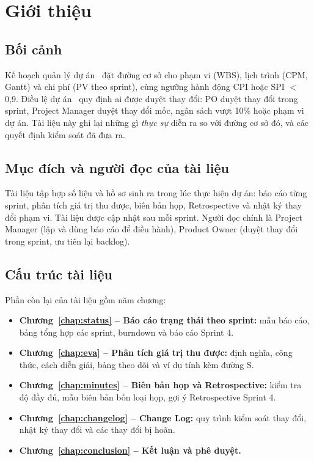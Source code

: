 \documentclass[12pt,a4paper]{report}
\begin{document}
\cleardoublepage{}
{}
\listoffigures

\cleardoublepage{}
{}
\listoftables

\chapter{Giới thiệu}
\label{chap:intro}

\section{Bối cảnh}

Kế hoạch quản lý dự án~\cite{pmp} đặt đường cơ sở cho phạm vi (WBS), lịch trình (CPM, Gantt) và chi phí (PV theo
sprint), cùng ngưỡng hành động CPI hoặc SPI $<$ 0,9. Điều lệ dự án~\cite{pid} quy định ai được duyệt thay đổi: PO
duyệt thay đổi trong sprint, Project Manager duyệt thay đổi mốc, ngân sách vượt 10\% hoặc phạm vi dự án. Tài liệu này ghi
lại những gì \emph{thực sự} diễn ra so với đường cơ sở đó, và các quyết định kiểm soát đã đưa ra.

\section{Mục đích và người đọc của tài liệu}

Tài liệu tập hợp số liệu và hồ sơ sinh ra trong lúc thực hiện dự án: báo cáo từng sprint, phân tích giá trị thu
được, biên bản họp, Retrospective và nhật ký thay đổi phạm vi. Tài liệu được cập nhật sau mỗi sprint. Người đọc
chính là Project Manager (lập và dùng báo cáo để điều hành), Product Owner (duyệt thay đổi trong sprint, ưu tiên
lại backlog).

\section{Cấu trúc tài liệu}

Phần còn lại của tài liệu gồm năm chương:
\begin{itemize}
  \item \textbf{Chương~\ref{chap:status} -- Báo cáo trạng thái theo sprint:} mẫu báo cáo, bảng tổng hợp các sprint,
        burndown và báo cáo Sprint 4.
  \item \textbf{Chương~\ref{chap:eva} -- Phân tích giá trị thu được:} định nghĩa, công thức, cách diễn giải, bảng
        theo dõi và ví dụ tính kèm đường S.
  \item \textbf{Chương~\ref{chap:minutes} -- Biên bản họp và Retrospective:} kiểm tra độ đầy đủ, mẫu biên bản bốn
        loại họp, gợi ý Retrospective Sprint 4.
  \item \textbf{Chương~\ref{chap:changelog} -- Change Log:} quy trình kiểm soát thay đổi, nhật ký thay đổi và các
        thay đổi bị hoãn.
  \item \textbf{Chương~\ref{chap:conclusion} -- Kết luận và phê duyệt.}
\end{itemize}
\end{document}
